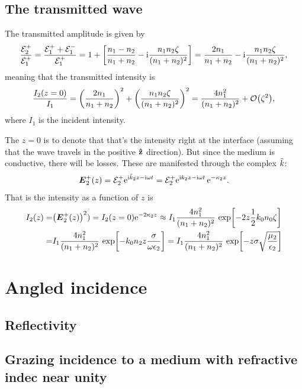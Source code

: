 \documentclass[11pt,letter, swedish, english
]{article}
\begin{document}
\subsection{The transmitted wave}
The transmitted amplitude is given by
\begin{equation}
\frac{{\mathcal{E}_2^+}}{{\mathcal{E}_1^+}} = \frac{{\mathcal{E}_1^+} + {\mathcal{E}_1^-}}{{\mathcal{E}_1^+}} 
= 1 + \qty[\frac{n_1-n_2}{n_1+n_2}
-\mathrm{i}\frac{n_1n_2\zeta}{(n_1+n_2)^2}]
= \frac{2n_1}{n_1+n_2}
-\mathrm{i}\frac{n_1n_2\zeta}{(n_1+n_2)^2},
\end{equation}
meaning that the transmitted intensity is
\begin{equation}
\frac{I_2(z=0)}{I_1} = \qty(\frac{2n_1}{n_1+n_2})^2
+\qty(\frac{n_1n_2\zeta}{(n_1+n_2)^2})^2
= \frac{4n_1^2}{(n_1+n_2)^2} + \order{\zeta^2},
\end{equation}
where $I_1$ is the incident intensity. 

The $z=0$ is to denote that that's the intensity right at the
interface (assuming that the wave travels in the positive $\vu{z}$
direction). But since the medium is conductive, there will be
losses. These are manifested through the complex $\tilde{k}$:
\begin{equation}
\vb*E_2^+(z) = {\mathcal{E}_2^+} \mathrm{e}^{\mathrm{i}\tilde{k}_2 z - \mathrm{i}\omega t}
={\mathcal{E}_2^+} \mathrm{e}^{\mathrm{i} k_2z - \mathrm{i}\omega t}\,\mathrm{e}^{-\kappa_2z}.
\end{equation}
That is the intensity as a function of $z$ is
\begin{equation}
\begin{aligned}
I_2(z)=&\qty(\vb*E_2^+(z))^2)=I_2(z=0)\mathrm{e}^{-2\kappa_2z}
\approx I_1 \frac{4n_1^2}{(n_1+n_2)^2}\,\exp[-2z\frac{1}{2}k_0n_0\zeta]\\
=&I_1 \frac{4n_1^2}{(n_1+n_2)^2}\,
\exp[-k_0n_2z\frac{\sigma}{\omega\epsilon_2}]
=I_1 \frac{4n_1^2}{(n_1+n_2)^2}\,
\exp[-z\sigma\sqrt{\frac{\mu_2}{\epsilon_2}}]
\end{aligned}
\end{equation}





\section{Angled incidence}


\subsection{Reflectivity}

\subsection{Grazing incidence to a medium with 
refractive indec near unity}
\newcommand{\thetac}{\theta_\text{c}}
\newcommand{\phic}{\phi_\text{c}}
\end{document}
